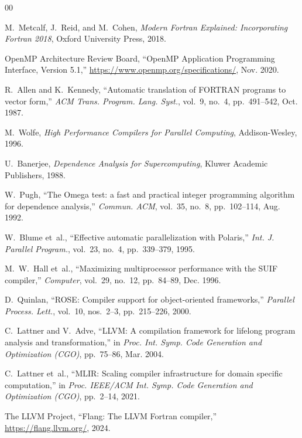 \documentclass[conference]{IEEEtran}
\begin{document}
\begin{thebibliography}{00}

M.~Metcalf, J.~Reid, and M.~Cohen,
\textit{Modern Fortran Explained: Incorporating Fortran 2018},
Oxford University Press, 2018.

OpenMP Architecture Review Board,
``OpenMP Application Programming Interface, Version 5.1,''
\url{https://www.openmp.org/specifications/}, Nov. 2020.

R.~Allen and K.~Kennedy,
``Automatic translation of {FORTRAN} programs to vector form,''
\textit{ACM Trans. Program. Lang. Syst.}, vol.~9, no.~4,
pp.~491--542, Oct. 1987.

M.~Wolfe,
\textit{High Performance Compilers for Parallel Computing},
Addison-Wesley, 1996.

U.~Banerjee,
\textit{Dependence Analysis for Supercomputing},
Kluwer Academic Publishers, 1988.

W.~Pugh,
``The Omega test: a fast and practical integer programming algorithm for
dependence analysis,''
\textit{Commun. ACM}, vol.~35, no.~8, pp.~102--114, Aug. 1992.

W.~Blume et~al.,
``Effective automatic parallelization with Polaris,''
\textit{Int. J. Parallel Program.}, vol.~23, no.~4, pp.~339--379, 1995.

M.~W.~Hall et~al.,
``Maximizing multiprocessor performance with the {SUIF} compiler,''
\textit{Computer}, vol.~29, no.~12, pp.~84--89, Dec. 1996.

D.~Quinlan,
``{ROSE}: Compiler support for object-oriented frameworks,''
\textit{Parallel Process. Lett.}, vol.~10, nos.~2--3, pp.~215--226, 2000.

C.~Lattner and V.~Adve,
``{LLVM}: A compilation framework for lifelong program analysis and
transformation,''
in \textit{Proc. Int. Symp. Code Generation and Optimization (CGO)},
pp.~75--86, Mar. 2004.

C.~Lattner et~al.,
``{MLIR}: Scaling compiler infrastructure for domain specific computation,''
in \textit{Proc. IEEE/ACM Int. Symp. Code Generation and Optimization (CGO)},
pp.~2--14, 2021.

The LLVM Project,
``Flang: The {LLVM} {F}ortran compiler,''
\url{https://flang.llvm.org/}, 2024.


\end{thebibliography}
\end{document}
